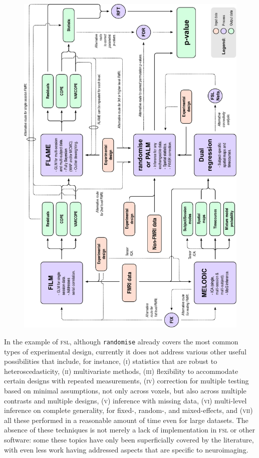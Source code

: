 \begin{figure}[!p]
\begin{center}
\includegraphics[width=\textwidth]{figures/fsl.pdf}
\end{center}
\label{fig:fsl_noref}
\end{figure}

In the example of \textsc{fsl}, although \texttt{randomise} already covers the most common types of experimental design, currently it does not address various other useful possibilities that include, for instance, (\textsc{i}) statistics that are robust to heteroscedasticity, (\textsc{ii}) multivariate methods, (\textsc{iii}) flexibility to accommodate certain designs with repeated measurements, (\textsc{iv}) correction for multiple testing based on minimal assumptions, not only across voxels, but also across multiple contrasts and multiple designs, (\textsc{v}) inference with missing data, (\textsc{vi}) multi-level inference on complete generality, for fixed-, random-, and mixed-effects, and (\textsc{vii}) all these performed in a reasonable amount of time even for large datasets. The absence of these techniques is not merely a lack of implementation in \textsc{fsl} or other software: some these topics have only been superficially covered by the literature, with even less work having addressed aspects that are specific to neuroimaging.

